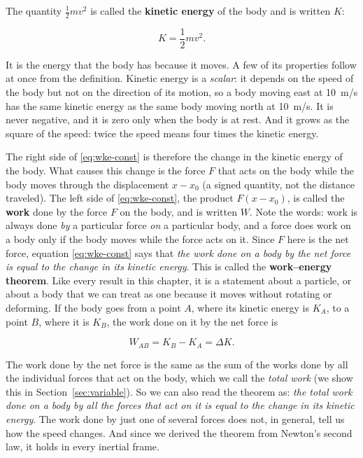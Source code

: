 \documentclass[11pt,a4paper]{article}
\begin{document}
The quantity $\frac12 mv^2$ is called the \textbf{kinetic energy} of the body and is written $K$:
\begin{keyresult}
\begin{equation}\label{eq:K}
  K = \frac12 mv^2 .
\end{equation}
\end{keyresult}
It is the energy that the body has because it moves. A few of its properties follow at once from the
definition. Kinetic energy is a \emph{scalar}: it depends on the speed of the body but not on the
direction of its motion, so a body moving east at \qty{10}{m/s} has the same kinetic energy as the
same body moving north at \qty{10}{m/s}. It is never negative, and it is zero only when the body is at
rest. And it grows as the square of the speed: twice the speed means four times the kinetic energy.

The right side of \eqref{eq:wke-const} is therefore the change in the kinetic energy of the body. What
causes this change is the force $F$ that acts on the body while the body moves through the
displacement $x - x_0$ (a signed quantity, not the distance traveled). The left side of
\eqref{eq:wke-const}, the product $F(x - x_0)$, is called the \textbf{work} done by the force $F$ on
the body, and is written $W$. Note the words: work is always done \emph{by} a particular force
\emph{on} a particular body, and a force does work on a body only if the body moves while the force
acts on it. Since $F$ here is the net force, equation \eqref{eq:wke-const} says that \emph{the work
done on a body by the net force is equal to the change in its kinetic energy}. This is called the
\textbf{work--energy theorem}. Like every result in this chapter, it is a statement about a particle,
or about a body that we can treat as one because it moves without rotating or deforming. If the body goes from a
point $A$, where its kinetic energy is $K_A$, to a point $B$, where it is $K_B$, the work done on it by
the net force is
\begin{keyresult}
\begin{equation}\label{eq:wke}
  W_{AB} = K_B - K_A = \Delta K .
\end{equation}
\end{keyresult}
The work done by the net force is the same as the sum of the works done by all the individual forces
that act on the body, which we call the \emph{total work} (we show this in
Section~\ref{sec:variable}). So we can also read the theorem as: \emph{the total work done on a body
by all the forces that act on it is equal to the change in its kinetic energy}. The work done by just
one of several forces does not, in general, tell us how the speed changes. And since we derived the
theorem from Newton's second law, it holds in every inertial frame.
\end{document}
